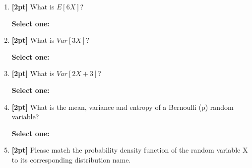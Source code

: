 \documentclass[12pt]{article}
\renewcommand{\circle}{\tikz\draw[black] (0,0) circle (1ex);}
\begin{document}
\begin{enumerate}
    \item \textbf{[2pt]} What is $E[6X]$?

    \textbf{Select one:}


    \item \textbf{[2pt]} What is $Var[3X]$?

    \textbf{Select one:}


    \item \textbf{[2pt]} What is $Var[2X + 3]$?

    \textbf{Select one:}


    \item \textbf{[2pt]} What is the mean, variance and entropy of a Bernoulli (p) random variable?
    
    \textbf{Select one:}
    

    \item \textbf{[2pt]} Please match the probability density function of the random variable X to its corresponding distribution name.
    

\end{enumerate}
\end{document}
